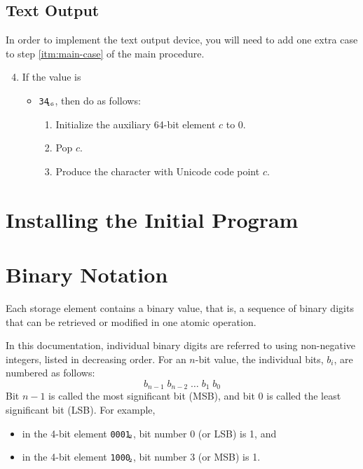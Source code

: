 \documentclass[a4paper,12pt]{article}
\newcommand{\num}[1]{\texttt{#1}\xspace}
\newcommand{\hex}[1]{\num{#1}$_{\textup{\tiny\hskip-1ex 16}}$\xspace}
\newcommand{\bin}[1]{\num{#1}$_{\textup{\tiny\hskip-1ex 2}}$\xspace}
\newcommand{\op}[1]{#1}
\newcommand{\PUTCHAR}   [1]{\op{\hex{34}}}
\begin{document}
\subsection{Text Output}

In order to implement the text output device, you will need to add one extra case to step \ref{itm:main-case} of the main procedure.

\begin{enumerate}
  \setcounter{enumi}{3}
\item If the value is
  \begin{itemize}
  \item \PUTCHAR{}, then do as follows:
    \begin{enumerate}
    \item Initialize the auxiliary 64-bit element $c$ to 0.
    \item Pop $c$.
    \item Produce the character with Unicode code point $c$.
    \end{enumerate}
  \end{itemize}
\end{enumerate}

\section{Installing the Initial Program}

\appendix

\section{Binary Notation}
\label{sec:binary-notation}

Each storage element contains a binary value, that is, a sequence of binary digits that can be retrieved or modified in one atomic operation.

In this documentation, individual binary digits are referred to using non-negative integers, listed in decreasing order.
For an $n$-bit value, the individual bits, $b_i$, are numbered as follows:
\[ b_{n-1} \; b_{n-2} \; \ldots \; b_{1} \; b_{0} \]
Bit $n-1$ is called the most significant bit (MSB), and bit 0 is called the least significant bit (LSB).
For example,
\begin{itemize}
\item in the 4-bit element \bin{0001}, bit number 0 (or LSB) is 1, and
\item in the 4-bit element \bin{1000}, bit number 3 (or MSB) is 1.
\end{itemize}
\end{document}
